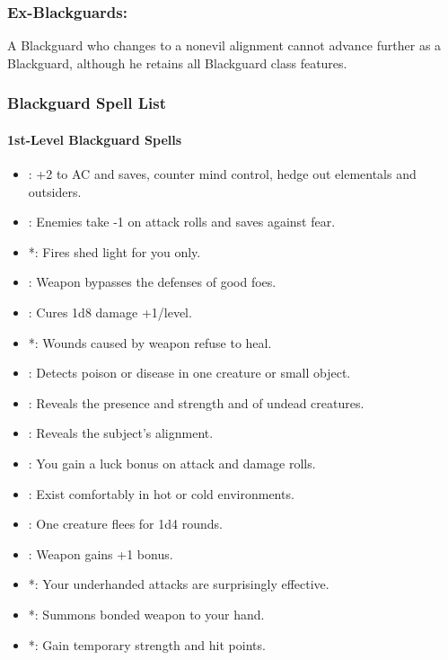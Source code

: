 \subsubsection{Ex-Blackguards:}
A Blackguard who changes to a nonevil alignment cannot advance further as a Blackguard, although he retains all Blackguard class features.

\subsubsection{Blackguard Spell List}
\label{sec:BlackguardSpellList}
\paragraph{1st-Level Blackguard Spells}
\begin{itemize}
\item {}: +2 to AC and saves, counter mind control, hedge out elementals and outsiders.
\item {}: Enemies take -1 on attack rolls and saves against fear.%
\item {}*: Fires shed light for you only. %
\item {}: Weapon bypasses the defenses of good foes. %
\item {}: Cures 1d8 damage +1/level.
\item {}*: Wounds caused by weapon refuse to heal. %
\item {}: Detects poison or disease in one creature or small object.
\item {}: Reveals the presence and strength and of undead creatures.
\item {}: Reveals the subject's alignment.
\item {}: You gain a luck bonus on attack and damage rolls.
\item {}: Exist comfortably in hot or cold environments.
\item {}: One creature flees for 1d4 rounds. %
\item {}: Weapon gains +1 bonus.
\item {}*: Your underhanded attacks are surprisingly effective. %
\item {}*: Summons bonded weapon to your hand.
\item {}*: Gain temporary strength and hit points.
\end{itemize}
